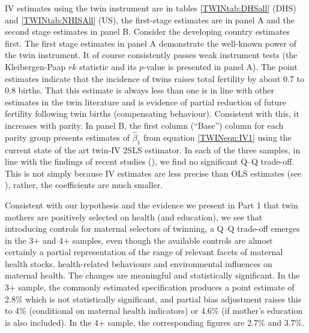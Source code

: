 \documentclass[subeqn]{article}
\begin{document}
\begin{spacing}{1.4}
IV estimates using the twin instrument are in %
tables \ref{TWINtab:DHSall} (DHS) and \ref{TWINtab:NHISAll} (US), the first-stage estimates are in panel A and the second stage estimates in panel B.  
Consider the developing country estimates first. 
The first stage estimates in panel A demonstrate the well-known power of the twin instrument. It of course consistently passes weak instrument tests (the Kleibergen-Paap $rk$ statistic and its $p$-value is presented in panel A). The point estimates indicate that the incidence of twins raises total fertility by about 0.7 to 0.8 births. That this estimate is always less than one is in line with other estimates in the twin literature and is evidence of partial reduction of future fertility following twin births (compensating behaviour). Consistent with this, it increases with parity.
In panel B, the first column (``Base'') column for each parity group presents estimates of $\hat\beta_1$ from equation
\ref{TWINeqn:IV1} using the current state of the art twin-IV 2SLS estimator. In each of the three samples, in line with the findings of recent studies (\citet{Angristetal2010,Blacketal2005,Caceres2006, FitzsimonsMalde2014}), %
we find no significant Q--Q trade-off. %
This is not simply because IV estimates are less precise than OLS estimates (see \citet{Angristetal2010}), rather, the coefficients are much smaller. 

Consistent with our hypothesis and the evidence we present in Part 1 that twin mothers are positively selected on health (and education), we see that introducing controls for maternal selectors of twinning, a Q--Q trade-off emerges in the 3+ and 4+ samples, even though the available controls are almost certainly a partial representation of the range of relevant facets of maternal health stocks,  health-related behaviours and environmental influences on maternal health. 
The changes are meaningful and statistically significant. In the 3+ sample, the commonly estimated specification produces a point estimate of 2.8\% which is not statistically significant, and partial bias adjustment raises this to 4\% (conditional on maternal health indicators) or 4.6\% (if mother's education is also included). In the 4+ sample, the corresponding figures are 2.7\% and 3.7\%. 


\end{spacing}
\end{document}
